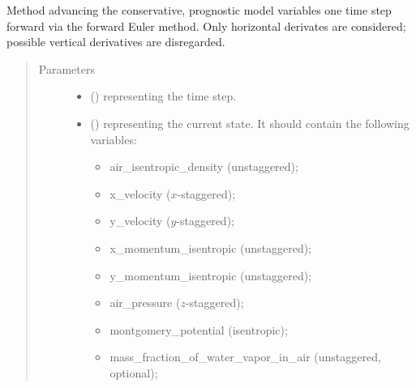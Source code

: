 \documentclass[letterpaper,10pt,english]{sphinxmanual}
\begin{document}
\begin{fulllineitems}
\begin{fulllineitems}
\end{fulllineitems}


\begin{fulllineitems}
\label{\detokenize{api:dycore.prognostic_isentropic_forward_euler.PrognosticIsentropicForwardEuler.step_neglecting_vertical_advection}}
Method advancing the conservative, prognostic model variables one time step forward
via the forward Euler method. Only horizontal derivates are considered; possible vertical
derivatives are disregarded.
\begin{quote}\begin{description}
\item[{Parameters}] \leavevmode\begin{itemize}
\item {} 
 () \textendash{}  representing the time step.

\item {} 
 () \textendash{} 
{\hyperref[\detokenize{api:storages.state_isentropic.StateIsentropic}]{}} representing the current state.
It should contain the following variables:
\begin{itemize}
\item {} 
air\_isentropic\_density (unstaggered);

\item {} 
x\_velocity (\(x\)-staggered);

\item {} 
y\_velocity (\(y\)-staggered);

\item {} 
x\_momentum\_isentropic (unstaggered);

\item {} 
y\_momentum\_isentropic (unstaggered);

\item {} 
air\_pressure (\(z\)-staggered);

\item {} 
montgomery\_potential (isentropic);

\item {} 
mass\_fraction\_of\_water\_vapor\_in\_air (unstaggered, optional);


\end{itemize}
\end{itemize}
\end{description}
\end{quote}
\end{fulllineitems}
\end{fulllineitems}
\end{document}
